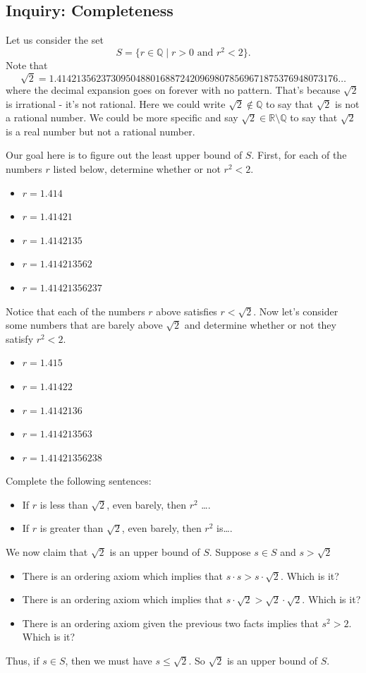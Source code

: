 \documentclass[11pt]{article}
\newenvironment{task}
	{\begin{mdframed}[linecolor=lightgray, linewidth=3pt]\raggedright}
	{\end{mdframed}}
\theoremstyle{definition}
\begin{document}
\subsection{Inquiry: Completeness}
\begin{task}
  Let us consider the set
  \[ S = \{ r\in \mathbb{Q} \mid r > 0 \text{ and } r^2 < 2 \}. \]
  Note that 
  \[ \sqrt{2} = 1.414213562373095048801688724209698078569671875376948073176\dots\]
  where the decimal expansion goes on forever with no pattern. That's because $\sqrt{2}$ is irrational - it's not rational. Here we could
  write $\sqrt{2}\not\in\mathbb{Q}$ to say that $\sqrt{2}$ is not a rational number. We could be more specific and say
  $\sqrt{2}\in\mathbb{R}\setminus \mathbb{Q}$ to say that $\sqrt{2}$ is a real number but not a rational number.

  Our goal here is to figure out the least upper bound of $S$. First, for each of the numbers $r$ listed below, determine whether or not
  $r^2 < 2$.
  \begin{itemize}
    \item $r=1.414$
    \item $r=1.41421$
    \item $r=1.4142135$
    \item $r=1.414213562$
    \item $r=1.41421356237$
  \end{itemize}
  Notice that each of the numbers $r$ above satisfies $r < \sqrt{2}$. Now let's consider some numbers that are barely above $\sqrt{2}$ and
  determine whether or not they satisfy $r^2 < 2$.
  \begin{itemize}
    \item $r=1.415$
    \item $r=1.41422$
    \item $r=1.4142136$
    \item $r=1.414213563$
    \item $r=1.41421356238$
  \end{itemize}
  Complete the following sentences:
  \begin{itemize}
    \item If $r$  is less than $\sqrt{2}$, even barely, then $r^2$ \dots.
    \item If $r$  is greater than $\sqrt{2}$, even barely, then $r^2$ is\dots.
  \end{itemize}
  We now claim that $\sqrt{2}$ is an upper bound of $S$. Suppose $s\in S$ and $s > \sqrt{2}$
  \begin{itemize}
    \item There is an ordering axiom which implies that $s\cdot s > s\cdot \sqrt{2}$. Which is it?
    \item There is an ordering axiom which implies that $s\cdot \sqrt{2} > \sqrt{2}\cdot \sqrt{2}$. Which is it?
    \item There is an ordering axiom given the previous two facts implies that $s^2 > 2$. Which is it?
  \end{itemize}
  Thus, if $s\in S$, then we must have $s\leq \sqrt{2}$. So $\sqrt{2}$ is an upper bound of $S$. 
  

\end{task}
\end{document}
